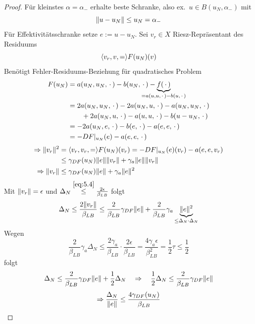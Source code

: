 \begin{proof}
	Für kleinstes $\alpha = \alpha_-$ erhalte beste Schranke, also ex.\ $u \in B(u_N,\alpha_-)$ mit
	\[
		\|u-u_N\| \leq u_N = \alpha_-
	\]
	Für Effektivitätsschranke setze $e := u-u_N$.
	Sei $v_r \in X$ Riesz-Repräsentant des Residuums
	\[
		\langle v_r,v, = \rangle F(u_N)(v)
	\]
	Benötigt Fehler-Residuums-Beziehung für quadratisches Problem
	\begin{align*}
		F(u_N) &= a(u_N,u_N,\pdot) - b(u_N,\pdot) - \underbrace{f(\pdot)}_{\mathclap{= a(u,u,\pdot)-b(u,\pdot)}}\\
		&= 2 a(u_N,u_N,\pdot) - 2 a(u_N,u,\pdot) - a(u_N,u_N,\pdot)\\
		&\qquad + 2 a(u_N,u,\pdot) - a(u,u,\pdot) - b(u-u_N,\pdot)\\
		&= -2 a(u_N,e,\pdot) - b(e,\pdot) - a(e,e,\pdot)\\
		&= -DF|_{u_N}(e) - a(e,e,\pdot)
	\end{align*}
	\begin{align*}
		\Rightarrow \|v_r\|^2 &= \langle v_r,v_r, = \rangle F(u_N)(v_r) = -DF|_{u_N}(e)(v_r) - a(e,e,v_r)\\
		&\leq \gamma_{DF}(u_N) \|e\| \|v_r\| + \gamma_a \|e\| \|v_r\|\\
		\Rightarrow \|v_r\| &\leq \gamma_{DF}(u_N) \|e\| + \gamma_a \|e\|^2
	\end{align*}
	Mit $\|v_r\| = \epsilon$ und $\Delta_N \stackrel{\eqref{eq:5.4}}{\leq} \frac{2 \epsilon}{\beta_{LB}}$ folgt
	\[
		\Delta_N \leq \frac{2 \|v_r\|}{\beta_{LB}} \leq \frac{2}{\beta_{LB}} \gamma_{DF} \|e\| + \frac{2}{\beta_{LB}} \gamma_a \underbrace{\|e\|^2}_{\leq \Delta_N \cdot \Delta_N}
	\]
	Wegen
	\[
		\frac{2}{\beta_{LB}} \gamma_a \Delta_N \leq \frac{2 \gamma_a}{\beta_{LB}} \cdot \frac{2 \epsilon}{\beta_{LB}} = \frac{4 \gamma_a \epsilon}{\beta_{LB}^2} = \frac{1}{2} \tau \leq \frac{1}{2}
	\]
	folgt
	\[
		\Delta_N \leq \frac{2}{\beta_{LB}} \gamma_{DF} \|e\| + \frac{1}{2} \Delta_N \quad \Rightarrow \quad \frac{1}{2} \Delta_N \leq \frac{2}{\beta_{LB}} \gamma_{DF} \|e\|
	\]
	\[
		\Rightarrow \frac{\Delta_N}{\|e\|} \leq \frac{4 \gamma_{DF}(u_N)}{\beta_{LB}}
	\]
\end{proof}

